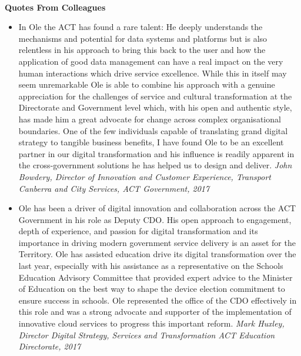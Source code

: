 \documentclass[11pt,a4paper]{article}
\begin{document}
\pagebreak
\begin{center}
  \hrulefill \\
  {\bf Quotes From Colleagues} \\[-0.2cm]
  \hrulefill
\end{center}

\begin{itemize}
\item In Ole the ACT has found a rare talent: He deeply understands the mechanisms and potential for data systems and platforms but is also relentless in his approach to bring this back to the user and how the application of good data management can have a real impact on the very human interactions which drive service excellence. While this in itself may seem unremarkable Ole is able to combine his approach with a genuine appreciation for the challenges of service and cultural transformation at the Directorate and Government level which, with his open and authentic style, has made him a great advocate for change across complex organisational boundaries.
One of the few individuals capable of translating grand digital strategy to tangible business benefits, I have found Ole to be an excellent partner in our digital transformation and his influence is readily apparent in the cross-government solutions he has helped us to design and deliver.
\emph{John Bowdery, Director of Innovation and Customer Experience, Transport Canberra and City Services, ACT Government, 2017}

\item Ole has been a driver of digital innovation and collaboration across the ACT Government in his role as Deputy CDO. His open approach to engagement, depth of experience, and passion for digital transformation and its importance in driving modern government service delivery is an asset for the Territory. Ole has assisted education drive its digital transformation over the last year, especially with his assistance as a representative on the Schools Education Advisory Committee that provided expert advice to the Minister of Education on the best way to shape the device election commitment to ensure success in schools. Ole represented the office of the CDO effectively in this role and was a strong advocate and supporter of the implementation of innovative cloud services to progress this important reform.
\emph{Mark Huxley, Director Digital Strategy, Services and Transformation ACT Education Directorate, 2017}


\end{itemize}
\end{document}
